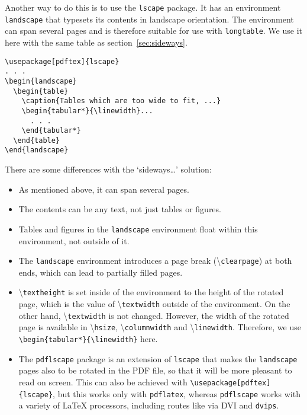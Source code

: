 \documentclass[twoside]{article}
\newcommand\cs[1]{\textbackslash\texttt{#1}}
\begin{document}
Another way to do this is to use the \texttt{lscape} package. It has an environment \texttt{landscape} that typesets its contents in landscape orientation. The environment can span several pages and is therefore suitable for use with \texttt{longtable}.
We use it here with the same table as section~\ref{sec:sideways}.

\medskip

\noindent
\begin{boxedminipage}{\textwidth}
\begin{verbatim}
\usepackage[pdftex]{lscape}
. . .
\begin{landscape}
  \begin{table}
    \caption{Tables which are too wide to fit, ...}
    \begin{tabular*}{\linewidth}...
      . . .
    \end{tabular*}
  \end{table}
\end{landscape}
\end{verbatim}
\end{boxedminipage}

\medskip

There are some differences with the `sideways\ldots' solution:
\begin{itemize}
\item As mentioned above, it can span several pages.
\item The contents can be any text, not just tables or figures.
\item Tables and figures in the \texttt{landscape} environment float within this environment, not outside of it.
\item The \texttt{landscape} environment introduces a page break (\cs{clearpage}) at both ends, which can lead to partially filled pages.
\item \cs{textheight} is set inside of the environment to the height of the rotated page, which is the value of \cs{textwidth} outside of the environment. On the other hand, \cs{textwidth} is not changed. However, the width of the rotated page is available in \cs{hsize}, \cs{columnwidth} and  \cs{linewidth}. Therefore, we use \verb|\begin{tabular*}{\linewidth}| here.
\item The \texttt{pdflscape} package is an extension of \texttt{lscape} that makes the \texttt{landscape} pages also to be rotated in the PDF file, so that it will be more pleasant to read on screen. This can also be achieved with \verb|\usepackage[pdftex]{lscape}|, but this works only with \texttt{pdflatex}, whereas \texttt{pdflscape} works with a variety of \LaTeX{} processors, including routes like via DVI and \texttt{dvips}.
\end{itemize}
\end{document}
